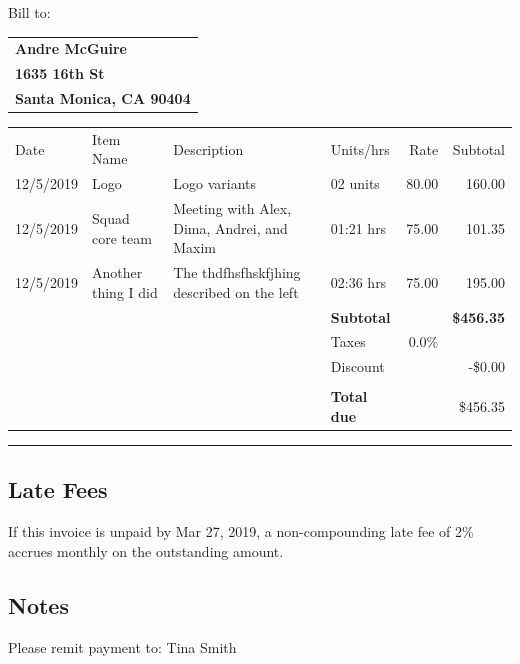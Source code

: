 \documentclass[10pt]{article}
\begin{document}
\def\arraystretch{1.5} %

Bill to:\\
\begin{tabular}{l}
\textbf{Andre McGuire} \\
\textbf{1635 16th St }\\
\textbf{Santa Monica, CA 90404}
\end{tabular}

\hspace{-5pt}\begin{tabular}{llp{.4\linewidth}lrr}
   \rowcolor{slightlylightergray}  Date & Item Name & Description & Units/hrs & Rate & Subtotal \\
    12/5/2019 & Logo & Logo variants    & 02 units & 80.00 & 160.00\\
    12/5/2019 & Squad core team & Meeting with Alex, Dima, Andrei, and Maxim & 01:21 hrs & 75.00 & 101.35 \\
    12/5/2019 & Another thing I did & The thdfhsfhskfjhing described on the left & 02:36 hrs & 75.00 & 195.00\\
    \addlinespace
    \cline{1-6}
    \addlinespace
   &&& \textbf{Subtotal} && \textbf{\$456.35}\\
   &&& Taxes   & 0.0\% \\
   &&& Discount && -\$0.00 \\
   \cline{4-6} \\
   &&& \textbf{Total due} && {\color{red} \$456.35}
   \\
   \cline{4-6}
\end{tabular}

\vspace{1cm}
{\color{gray} \hrule}

\subsection*{\color{lightgray} Late Fees}
If this invoice is unpaid by Mar 27, 2019, a non-compounding late fee of 2\% accrues monthly on the outstanding amount.

\vspace{1cm}
\subsection*{\color{lightgray} Notes}
Please remit payment to: Tina Smith
\end{document}
